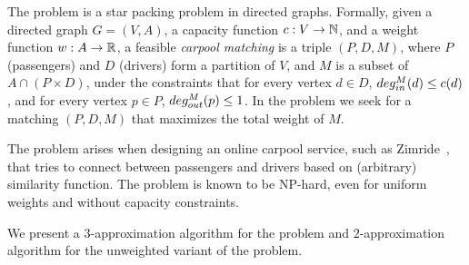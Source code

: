 The \textsc{\CARPOOL{}} problem is a star packing problem in directed graphs.
Formally, given a directed graph $G = (V, A)$,
a capacity function $ c: V \rightarrow \mathbb{N} $,
and a weight function $w : A \rightarrow \mathbb{R} $,
a feasible \emph{carpool matching} is a triple 
$(P, D, M)$, where $P$ (passengers) and $D$ (drivers) form a partition of $V$, 
and $M$ is a subset of $A \cap (P \times D)$,
under the constraints that for every vertex $d \in D$, 
$deg^M_{in}(d) \leq c(d)$, 
and for every vertex $p \in P$, $deg^M_{out}(p) \leq 1$.
In the \textsc{\CARPOOL{}} problem we seek for a matching $(P, D, M)$ that maximizes the
total weight of $M$.

The problem arises when designing an online carpool service, 
such as Zimride~\cite{zimride}, 
that tries to connect between passengers and drivers based on (arbitrary) similarity function.
The problem is known to be NP-hard, 
even for uniform weights and without capacity constraints.

We present a $3$-approximation algorithm for the problem
and $2$-approx\-imation algorithm for the unweighted variant of the problem.
